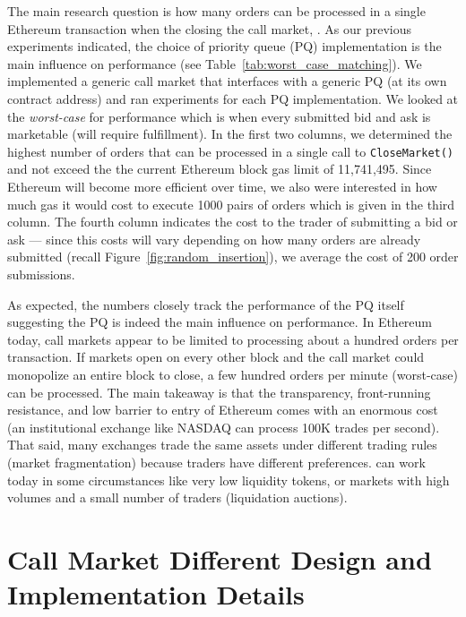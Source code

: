 The main research question is how many orders can be processed in a single Ethereum transaction when the closing the call market, . As our previous experiments indicated, the choice of priority queue (PQ) implementation is the main influence on performance (see Table~\ref{tab:worst_case_matching}). We implemented a generic call market that interfaces with a generic PQ (at its own contract address) and ran experiments for each PQ implementation. We looked at the \textit{worst-case} for performance which is when every submitted bid and ask is marketable (\ie will require fulfillment). In the first two columns, we determined the highest number of orders that can be processed in a single call to \texttt{CloseMarket()} and not exceed the the current Ethereum block gas limit of 11,741,495. Since Ethereum will become more efficient over time, we also were interested in how much gas it would cost to execute 1000 pairs of orders which is given in the third column. The fourth column indicates the cost to the trader of submitting a bid or ask --- since this costs will vary depending on how many orders are already submitted (recall Figure~\ref{fig:random_insertion}), we average the cost of 200 order submissions. 

As expected, the numbers closely track the performance of the PQ itself suggesting the PQ is indeed the main influence on performance. In Ethereum today, call markets appear to be limited to processing about a hundred orders per transaction. If markets open on every other block and the call market could monopolize an entire block to close, a few hundred orders per minute (worst-case) can be processed. The main takeaway is that the transparency, front-running resistance, and low barrier to entry of Ethereum comes with an enormous cost (\ie an institutional exchange like NASDAQ can process 100K trades per second). That said, many exchanges trade the same assets under different trading rules (\ie market fragmentation) because traders have different preferences. \cm can work today in some circumstances like very low liquidity tokens, or markets with high volumes and a small number of traders (\eg liquidation auctions). 








\section{Call Market Different Design and Implementation Details }




